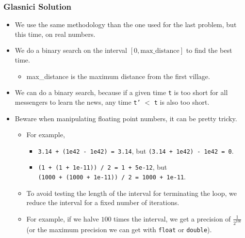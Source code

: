 \documentclass{beamer}
\newcommand{\spojlink}[2]{Sphere Online Judge (http://www.spoj.com)
  problem: \href{#2}{\textcolor{blue}{#1}.}}
\newcounter{exo}
\newcommand{\exo}{
  \addtocounter{exo}{1}
  Exercice \arabic{exo}
}
\begin{document}
\fi



\ifanswers

\begin{frame}%
\frametitle{Glasnici Solution}

\scriptsize

\begin{itemize}

\item We use the same methodology than the one used for the last problem, but this time, on real numbers.

\vspace{0.15cm}

\item<2-> We do a binary search on the interval $[0, \textrm{max\_distance}]$ to find the best time.
\begin{itemize}
\scriptsize
\vspace{0.07cm}
\item<2-> \textrm{max\_distance} is the maximum distance from the first village.
\end{itemize}

\vspace{0.15cm}

\item<3-> We can do a binary search, because if a given time \texttt{t} is too short for all messengers
to learn the news, any time \texttt{t'} $<$ \texttt{t} is also too short.

\vspace{0.15cm}

\item<4-> Beware when manipulating floating point numbers, it can be pretty tricky.
\begin{itemize}
\scriptsize
\vspace{0.07cm}
\item<4-> For example,
\begin{itemize}
\scriptsize
\item<4-> \texttt{3.14 + (1e42 - 1e42) = 3.14}, but \texttt{(3.14 + 1e42) - 1e42 = 0}.
\item<5-> \texttt{(1 + (1 + 1e-11)) / 2 = 1 + 5e-12}, but \\\texttt{(1000 + (1000 + 1e-11)) / 2 = 1000 + 1e-11}.
\end{itemize}
\vspace{0.08cm}
\item<6-> To avoid testing the length of the interval for terminating the loop, we reduce
the interval for a fixed number of iterations.
\vspace{0.08cm}
\item<7-> For example, if we halve $100$ times the interval, we get a precision of $\frac{1}{2^{100}}$ (or the maximum
precision we can get with \lstinline{float} or \lstinline{double}).


\end{itemize}
\end{itemize}
\end{frame}
\end{document}

